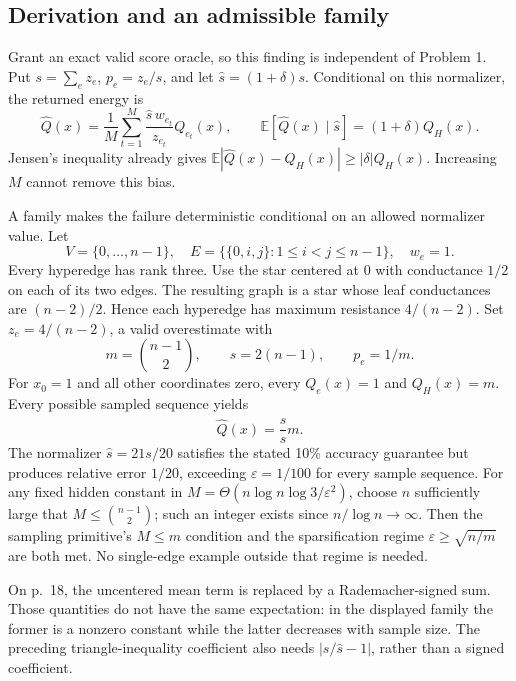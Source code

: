 \documentclass[10pt]{article}
\begin{document}
\subsection*{Derivation and an admissible family}
Grant an exact valid score oracle, so this finding is independent of Problem 1. Put \(s=\sum_e z_e\), \(p_e=z_e/s\), and let \(\widehat s=(1+\delta)s\). Conditional on this normalizer, the returned energy is \[\widehat Q(x)=\frac1M\sum_{t=1}^M
       \frac{\widehat s\,w_{e_t}}{z_{e_t}}Q_{e_t}(x),
 \qquad \mathbb E[\widehat Q(x)\mid\widehat s]=(1+\delta)Q_H(x).\] Jensen’s inequality already gives \(\mathbb E|\widehat Q(x)-Q_H(x)|\ge|\delta|Q_H(x)\). Increasing \(M\) cannot remove this bias.\par
A family makes the failure deterministic conditional on an allowed normalizer value. Let \[V=\{0,\ldots,n-1\},\quad
 E=\{\{0,i,j\}:1\le i<j\le n-1\},\quad w_e=1.\] Every hyperedge has rank three. Use the star centered at 0 with conductance \(1/2\) on each of its two edges. The resulting graph is a star whose leaf conductances are \((n-2)/2\). Hence each hyperedge has maximum resistance \(4/(n-2)\). Set \(z_e=4/(n-2)\), a valid overestimate with \[m=\binom{n-1}{2},\qquad s=2(n-1),\qquad p_e=1/m.\] For \(x_0=1\) and all other coordinates zero, every \(Q_e(x)=1\) and \(Q_H(x)=m\). Every possible sampled sequence yields \[\widehat Q(x)=\frac{\widehat s}{s}m.\] The normalizer \(\widehat s=21s/20\) satisfies the stated 10\% accuracy guarantee but produces relative error \(1/20\), exceeding \(\varepsilon=1/100\) for every sample sequence. For any fixed hidden constant in \(M=\Theta(n\log n\log3/\varepsilon^2)\), choose \(n\) sufficiently large that \(M\le\binom{n-1}{2}\); such an integer exists since \(n/\log n\to\infty\). Then the sampling primitive’s \(M\le m\) condition and the sparsification regime \(\varepsilon\ge\sqrt{n/m}\) are both met. No single-edge example outside that regime is needed.\par
On p. 18, the uncentered mean term is replaced by a Rademacher-signed sum. Those quantities do not have the same expectation: in the displayed family the former is a nonzero constant while the latter decreases with sample size. The preceding triangle-inequality coefficient also needs \(|s/\widehat s-1|\), rather than a signed coefficient.\par
\end{document}
